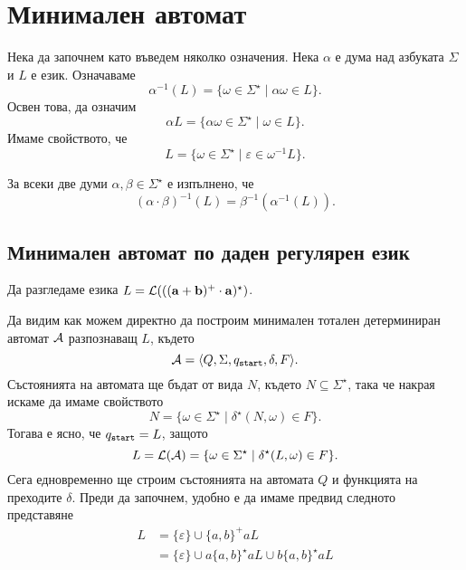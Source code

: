 \section{Минимален автомат}

Нека да започнем като въведем няколко означения.
Нека $\alpha$ е дума над азбуката $\Sigma$  и $L$ е език. Означаваме 
\[\alpha^{-1}(L) = \{\omega \in \Sigma^\star \mid \alpha\omega \in L\}.\]
Освен това, да означим 
\[\alpha L = \{\alpha\omega \in \Sigma^\star \mid \omega \in L\}.\]
Имаме свойството, че
\[L = \{\omega \in \Sigma^\star \mid \varepsilon \in \omega^{-1}L\}.\]

\begin{prop}
  \label{pr:pullback}
  За всеки две думи $\alpha, \beta \in \Sigma^\star$ е изпълнено, че 
  \[(\alpha\cdot\beta)^{-1}(L) = \beta^{-1}(\alpha^{-1}(L)).\]
\end{prop}

\subsection{Минимален автомат по даден регулярен език}
Да разгледаме езика $L = \mathcal{L}(\mathbf{((a+b)^+\cdot a)^\star})$.

Да видим как можем директно да построим минимален тотален детерминиран автомат $\mathcal{A}$ разпознаващ $L$, където
\[\mathcal{A} = \langle{Q,\Sigma,q_{\texttt{start}},\delta,F}\rangle.\]
Състоянията на автомата ще бъдат от вида $N$, където $N \subseteq \Sigma^\star$, така че накрая искаме да имаме свойството
\[N = \{\omega \in \Sigma^\star \mid \delta^\star(N,\omega) \in F\}.\]
Тогава е ясно, че $q_{\texttt{start}} = L$, защото 
\[L = \mathcal{L}(\mathcal{A}) = \{\omega \in \Sigma^\star \mid \delta^\star(L,\omega) \in F\}.\]
Сега едновременно ще строим състоянията на автомата $Q$ и функцията на преходите $\delta$.
Преди да започнем, удобно е да имаме предвид следното представяне
\begin{align*}
  L & = \{\varepsilon\} \cup \{a,b\}^+ a L\\
  & = \{\varepsilon\} \cup a\{a,b\}^\star aL \cup b\{a,b\}^\star aL
\end{align*}

